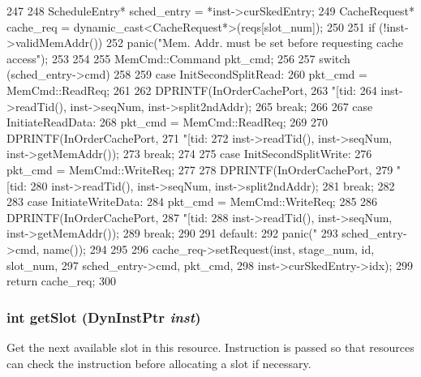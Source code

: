 \begin{DoxyCode}
247 {
248     ScheduleEntry* sched_entry = *inst->curSkedEntry;
249     CacheRequest* cache_req = dynamic_cast<CacheRequest*>(reqs[slot_num]);
250 
251     if (!inst->validMemAddr()) {
252         panic("Mem. Addr. must be set before requesting cache access\n");
253     }
254 
255     MemCmd::Command pkt_cmd;
256 
257     switch (sched_entry->cmd)
258     {
259       case InitSecondSplitRead:
260         pkt_cmd = MemCmd::ReadReq;
261 
262         DPRINTF(InOrderCachePort,
263                 "[tid:%
264                 inst->readTid(), inst->seqNum, inst->split2ndAddr);
265         break;
266 
267       case InitiateReadData:
268         pkt_cmd = MemCmd::ReadReq;
269 
270         DPRINTF(InOrderCachePort,
271                 "[tid:%
272                 inst->readTid(), inst->seqNum, inst->getMemAddr());
273         break;
274 
275       case InitSecondSplitWrite:
276         pkt_cmd = MemCmd::WriteReq;
277 
278         DPRINTF(InOrderCachePort,
279                 "[tid:%
280                 inst->readTid(), inst->seqNum, inst->split2ndAddr);
281         break;
282 
283       case InitiateWriteData:
284         pkt_cmd = MemCmd::WriteReq;
285 
286         DPRINTF(InOrderCachePort,
287                 "[tid:%
288                 inst->readTid(), inst->seqNum, inst->getMemAddr());
289         break;
290 
291       default:
292         panic("%
293               sched_entry->cmd, name());
294     }
295 
296     cache_req->setRequest(inst, stage_num, id, slot_num,
297                           sched_entry->cmd, pkt_cmd,
298                           inst->curSkedEntry->idx);
299     return cache_req;
300 }
\end{DoxyCode}
\hypertarget{classCacheUnit_ab3ba2ee95c723c8c056db0a1f2a6dfd3}{
\subsubsection[{getSlot}]{\setlength{\rightskip}{0pt plus 5cm}int getSlot ({\bf DynInstPtr} {\em inst})}}
\label{classCacheUnit_ab3ba2ee95c723c8c056db0a1f2a6dfd3}
Get the next available slot in this resource. Instruction is passed so that resources can check the instruction before allocating a slot if necessary. 

